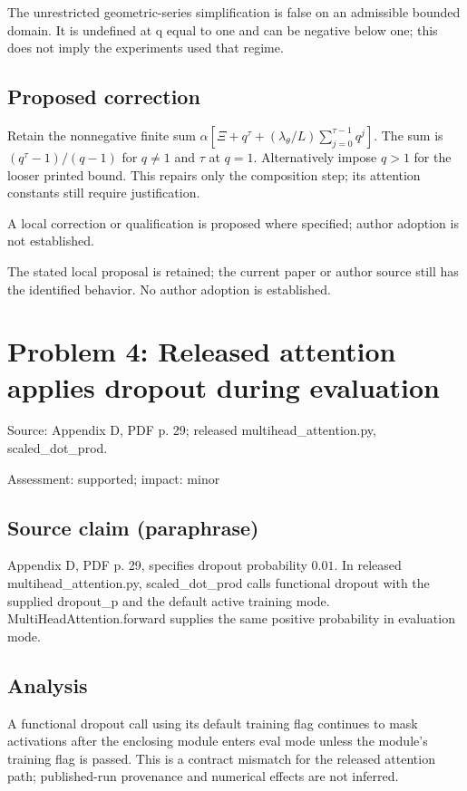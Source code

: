 \documentclass[11pt]{article}
\begin{document}
The unrestricted geometric-series simplification is false on an admissible bounded domain. It is undefined at q equal to one and can be negative below one; this does not imply the experiments used that regime.

\subsection*{Proposed correction}

Retain the nonnegative finite sum \(\alpha[\Xi+q^\tau+(\lambda_\theta/L)\sum_{j=0}^{\tau-1}q^j]\). The sum is \((q^\tau-1)/(q-1)\) for \(q\ne1\) and \(\tau\) at \(q=1\). Alternatively impose \(q>1\) for the looser printed bound. This repairs only the composition step; its attention constants still require justification.

A local correction or qualification is proposed where specified; author adoption is not established.

The stated local proposal is retained; the current paper or author source still has the identified behavior. No author adoption is established.

\section*{Problem 4: Released attention applies dropout during evaluation}

Source: Appendix D, PDF p. 29; released multihead\_attention.py, scaled\_dot\_prod.

Assessment: supported; impact: minor

\subsection*{Source claim (paraphrase)}

Appendix D, PDF p. 29, specifies dropout probability \(0.01\). In released multihead\_attention.py, scaled\_dot\_prod calls functional dropout with the supplied dropout\_p and the default active training mode. MultiHeadAttention.forward supplies the same positive probability in evaluation mode.

\subsection*{Analysis}

A functional dropout call using its default training flag continues to mask activations after the enclosing module enters eval mode unless the module's training flag is passed. This is a contract mismatch for the released attention path; published-run provenance and numerical effects are not inferred.
\end{document}
